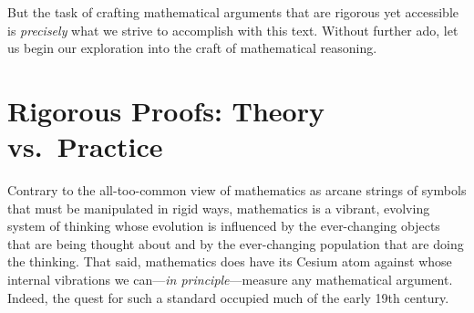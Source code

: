 But the task of crafting mathematical arguments that are rigorous yet
accessible is {\em precisely} what we strive to accomplish with this
text.  Without further ado, let us begin our exploration into the
craft of mathematical reasoning.

\section{Rigorous Proofs: Theory vs.~Practice}
\label{sec:reasoning-via-proofs}


Contrary to the all-too-common view of mathematics as arcane strings
of symbols that must be manipulated in rigid ways, mathematics is a
vibrant, evolving system of thinking whose evolution is influenced by
the ever-changing objects that are being thought about and by the
ever-changing population that are doing the thinking.  That said,
mathematics does have its Cesium atom against whose internal
vibrations we can---{\em in principle}---measure any mathematical
argument.  Indeed, the quest for such a standard occupied much of the
early 19th century.

\bigskip

